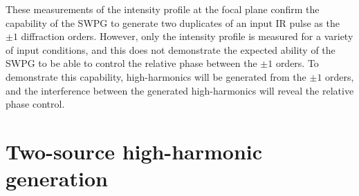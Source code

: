 These measurements of the intensity profile at the focal plane confirm the capability of the SWPG to generate two duplicates of an input IR pulse as the $\pm 1$ diffraction orders.  However, only the intensity profile is measured for a variety of input conditions, and this does not demonstrate the expected ability of the SWPG to be able to control the relative phase between the $\pm1$ orders.  To demonstrate this capability, high-harmonics will be generated from the $\pm1$ orders, and the interference between the generated high-harmonics will reveal the relative phase control.

\section{Two-source high-harmonic generation}

